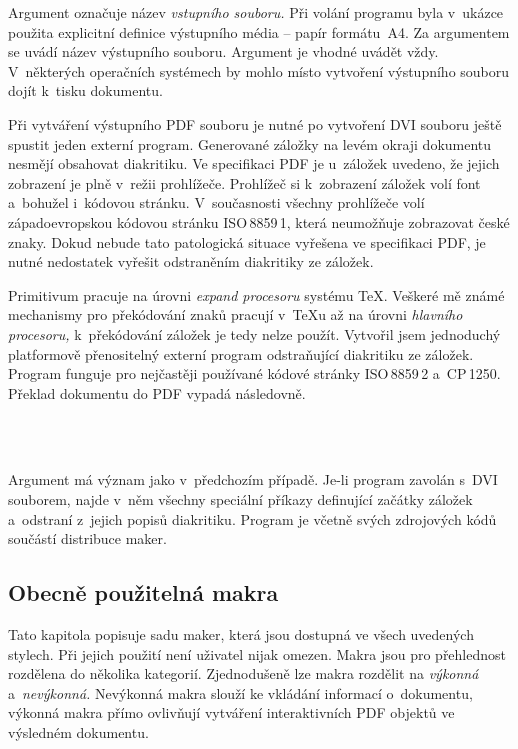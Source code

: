 \documentclass[12pt]{article}
\begin{document}
Argument  označuje název \emph{vstupního souboru.} Při volání 
programu  byla v~ukázce použita explicitní definice výstupního média
-- papír formátu~A4. Za argumentem  se uvádí název výstupního souboru.
Argument  je vhodné uvádět vždy. V~některých operačních systémech 
by mohlo místo vytvoření výstupního souboru dojít k~tisku dokumentu.

\medskip
Při vytváření výstupního PDF souboru je nutné po vytvoření DVI souboru ještě
spustit jeden externí program. Generované záložky na levém okraji dokumentu
nesmějí obsahovat diakritiku. Ve specifikaci PDF je u~záložek uvedeno, 
že jejich zobrazení je plně v~režii prohlížeče. Prohlížeč si k~zobrazení
záložek volí font a~bohužel i~kódovou stránku.
V~současnosti všechny prohlížeče volí západoevropskou kódovou 
stránku \mbox{ISO\,8859\,1},
která neumožňuje zobrazovat české znaky.
Dokud nebude tato patologická situace vyřešena ve specifikaci PDF, je nutné
nedostatek vyřešit odstraněním diakritiky ze záložek.

\medskip
Primitivum  pracuje 
na úrovni \emph{expand procesoru} systému \TeX. 
Veškeré mě známé mechanismy pro překódování znaků pracují
v~\TeX u až na úrovni \emph{hlavního procesoru,}
k~překódování záložek je tedy nelze použít.
Vytvořil jsem jednoduchý platformově přenositelný
externí program  odstraňující diakritiku ze záložek.
Program funguje pro nejčastěji používané kódové stránky 
\mbox{ISO\,8859\,2} a~\mbox{CP\,1250}.
Překlad dokumentu do PDF vypadá následovně.

\begin{flushleft}
   \\
   \\
\end{flushleft}

Argument  má význam jako v~předchozím případě. Je-li program
 zavolán s~DVI souborem, najde v~něm všechny speciální příkazy
definující začátky záložek a~odstraní z~jejich popisů diakritiku. Program
 je včetně svých zdrojových kódů součástí distribuce maker.

\subsection{Obecně použitelná makra}\label{obecna}
Tato kapitola popisuje sadu maker, která jsou dostupná ve všech uvedených
stylech. Při jejich použití není uživatel nijak omezen. 
Makra jsou pro přehlednost rozdělena do několika kategorií. Zjednodušeně lze
makra rozdělit na \emph{výkonná}
a~\emph{nevýkonná.}
Nevýkonná makra slouží ke vkládání informací o~dokumentu, výkonná makra přímo 
ovlivňují vytváření interaktivních PDF objektů ve výsledném dokumentu.
\end{document}
